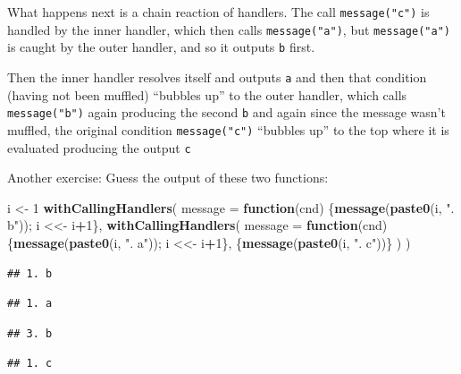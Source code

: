 \documentclass[]{book}
\newenvironment{Shaded}{\begin{snugshade}}{\end{snugshade}}
\newcommand{\ControlFlowTok}[1]{\textcolor[rgb]{0.13,0.29,0.53}{\textbf{#1}}}
\newcommand{\DataTypeTok}[1]{\textcolor[rgb]{0.13,0.29,0.53}{#1}}
\newcommand{\DecValTok}[1]{\textcolor[rgb]{0.00,0.00,0.81}{#1}}
\newcommand{\KeywordTok}[1]{\textcolor[rgb]{0.13,0.29,0.53}{\textbf{#1}}}
\newcommand{\NormalTok}[1]{#1}
\newcommand{\OperatorTok}[1]{\textcolor[rgb]{0.81,0.36,0.00}{\textbf{#1}}}
\newcommand{\StringTok}[1]{\textcolor[rgb]{0.31,0.60,0.02}{#1}}
\begin{document}
What happens next is a chain reaction of handlers. The call \texttt{message("c")} is handled by the inner handler, which then calls \texttt{message("a")}, but \texttt{message("a")} is caught by the outer handler, and so it outputs \texttt{b} first.

Then the inner handler resolves itself and outputs \texttt{a} and then that condition (having not been muffled) ``bubbles up'' to the outer handler, which calls \texttt{message("b")} again producing the second \texttt{b} and again since the message wasn't muffled, the original condition \texttt{message("c")} ``bubbles up'' to the top where it is evaluated producing the output \texttt{c}

Another exercise: Guess the output of these two functions:

\begin{Shaded}
\begin{Highlighting}[]
\NormalTok{i <-}\StringTok{ }\DecValTok{1}
\KeywordTok{withCallingHandlers}\NormalTok{(}
  \DataTypeTok{message =} \ControlFlowTok{function}\NormalTok{(cnd) \{}\KeywordTok{message}\NormalTok{(}\KeywordTok{paste0}\NormalTok{(i, }\StringTok{". b"}\NormalTok{)); i <<-}\StringTok{ }\NormalTok{i}\OperatorTok{+}\DecValTok{1}\NormalTok{\},}
  \KeywordTok{withCallingHandlers}\NormalTok{(}
    \DataTypeTok{message =} \ControlFlowTok{function}\NormalTok{(cnd) \{}\KeywordTok{message}\NormalTok{(}\KeywordTok{paste0}\NormalTok{(i, }\StringTok{". a"}\NormalTok{)); i <<-}\StringTok{ }\NormalTok{i}\OperatorTok{+}\DecValTok{1}\NormalTok{\},}
\NormalTok{    \{}\KeywordTok{message}\NormalTok{(}\KeywordTok{paste0}\NormalTok{(i, }\StringTok{". c"}\NormalTok{))\}}
\NormalTok{  )}
\NormalTok{)}
\end{Highlighting}
\end{Shaded}

\begin{verbatim}
## 1. b
\end{verbatim}

\begin{verbatim}
## 1. a
\end{verbatim}

\begin{verbatim}
## 3. b
\end{verbatim}

\begin{verbatim}
## 1. c
\end{verbatim}
\end{document}
